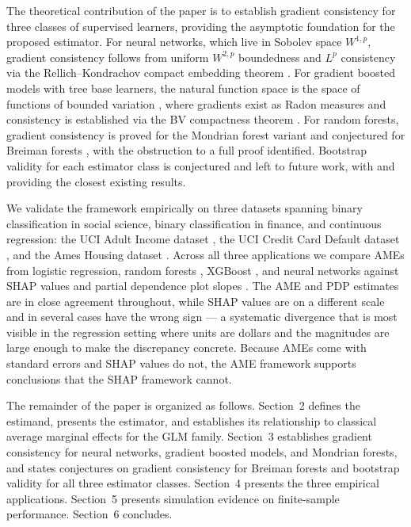 \documentclass[12pt]{article}
\begin{document}
	The theoretical contribution of the paper is to establish gradient consistency for three classes of supervised learners, providing the asymptotic foundation for the proposed estimator. For neural networks, which live in Sobolev space $W^{1,p}$, gradient consistency follows from uniform $W^{2,p}$ boundedness and $L^p$ consistency via the Rellich--Kondrachov compact embedding theorem \citep{evans2010pde, hornik1990universal}. For gradient boosted models with tree base learners, the natural function space is the space of functions of bounded variation \citep{ambrosio2000bv}, where gradients exist as Radon measures and consistency is established via the BV compactness theorem \citep{buhlmann2003boosting, mason2000boosting}. For random forests, gradient consistency is proved for the Mondrian forest variant \citep{lakshminarayanan2014mondrian, mourtada2017mondrian} and conjectured for Breiman forests \citep{breiman2001rf, scornet2015forests}, with the obstruction to a full proof identified. Bootstrap validity for each estimator class is conjectured and left to future work, with \citet{wager2014confidence} and \citet{wager2018forests} providing the closest existing results.
	
	We validate the framework empirically on three datasets spanning binary classification in social science, binary classification in finance, and continuous regression: the UCI Adult Income dataset \citep{kohavi1996, UCI}, the UCI Credit Card Default dataset \citep{yeh2009, UCI}, and the Ames Housing dataset \citep{decock2011}. Across all three applications we compare AMEs from logistic regression, random forests \citep{breiman2001rf}, XGBoost \citep{chen2016xgboost}, and neural networks against SHAP values \citep{lundberg2017shap} and partial dependence plot slopes \citep{friedman2001pdp}. The AME and PDP estimates are in close agreement throughout, while SHAP values are on a different scale and in several cases have the wrong sign --- a systematic divergence that is most visible in the regression setting where units are dollars and the magnitudes are large enough to make the discrepancy concrete. Because AMEs come with standard errors and SHAP values do not, the AME framework supports conclusions that the SHAP framework cannot.
	
	The remainder of the paper is organized as follows. Section~2 defines the estimand, presents the estimator, and establishes its relationship to classical average marginal effects for the GLM family. Section~3 establishes gradient consistency for neural networks, gradient boosted models, and Mondrian forests, and states conjectures on gradient consistency for Breiman forests and bootstrap validity for all three estimator classes. Section~4 presents the three empirical applications. Section~5 presents simulation evidence on finite-sample performance. Section~6 concludes.
	
\end{document}
